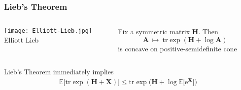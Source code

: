 \documentclass[compress,
mathserif,wide,%
]{beamer}
\begin{document}
\begin{frame}
\frametitle{Lieb's Theorem}



\begin{columns}

\begin{column}{0.25\textwidth}

\begin{center}
\texttt{[image: Elliott-Lieb.jpg]} \\
	{\small Elliott Lieb}
\end{center}

\end{column}

\begin{column}{0.6\textwidth}

\begin{theorem}[Lieb\,'73]
	\label{thm:Lieb}
	Fix a symmetric matrix $\bm{H}$. Then 
	\[
		\bm{A}~\mapsto~\mathrm{tr}\exp(\bm{H}+\log\bm{A})
	\]
	is concave on positive-semidefinite cone
\end{theorem}

\end{column}
\end{columns}


\vfill

Lieb's Theorem immediately implies  
%
\begin{align}
	\label{eq:Lieb-corollary}
	\mathbb{E}\big[\mathrm{tr}\exp(\bm{H}+\bm{X})\big]\leq\mathrm{tr}\exp\big(\bm{H}+\log\mathbb{E}\big[\mathrm{e}^{\bm{X}}\big]\big)
\end{align}
%


\end{frame}





\begin{comment}
\begin{frame}
	\frametitle{Proof sketch of Lieb's Theorem}


Main observation: $\mathrm{tr}(\cdot)$ admits a variational formula

\bigskip

\begin{lemma}
	\label{lem:trace-variational}
	For any $\bm{M}\succeq \bm{0}$, one has
	\vspace{-0.5em}
	\begin{align*}
		\mathrm{tr} \bm{M} = \sup_{\bm{T}\succ \bm{0}}  \mathrm{tr}~\big[ \hspace{-2em} \underset{\alertb{\text{relative entropy is }\bm{T} \log \bm{M} - \bm{T} \log \bm{T} + \bm{T} - \bm{M}}}{\underbrace{ \bm{T} \log \bm{M} - \bm{T} \log \bm{T} + \bm{T} }} \hspace{-2em}\big]
	\end{align*}
\end{lemma}


\end{frame}
\end{comment}
\end{document}
